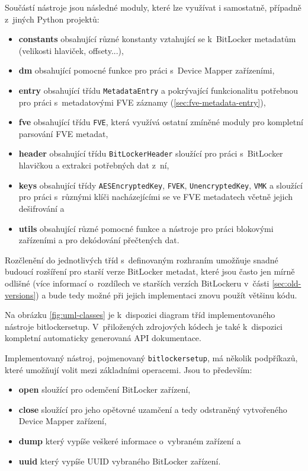 Součástí nástroje jsou následné moduly, které lze využívat i samostatně, případně z~jiných Python projektů:

\begin{itemize}
	\item \textbf{constants} obsahující různé konstanty vztahující se k~BitLocker metadatům (velikosti hlaviček, offsety...),
	\item \textbf{dm} obsahující pomocné funkce pro práci s~Device Mapper zařízeními,
	\item \textbf{entry} obsahující třídu \texttt{MetadataEntry} a pokrývající funkcionalitu potřebnou pro práci s~metadatovými FVE záznamy (\ref{sec:fve-metadata-entry}),
	\item \textbf{fve} obsahující třídu \texttt{FVE}, která využívá ostatní zmíněné moduly pro kompletní parsování FVE metadat,
	\item \textbf{header} obsahující třídu \texttt{BitLockerHeader} sloužící pro práci s~BitLocker hla\-vič\-kou a extrakci potřebných dat z~ní,
	\item \textbf{keys} obsahující třídy \texttt{AESEncryptedKey}, \texttt{FVEK}, \texttt{UnencryptedKey}, \texttt{VMK} a sloužící pro práci s~různými klíči nacházejícími se ve FVE metadatech včetně jejich dešifrování a
	\item \textbf{utils} obsahující různé pomocné funkce a nástroje pro práci blokovými zařízeními a pro dekódování přečtených dat.
\end{itemize}

Rozčlenění do jednotlivých tříd s~definovaným rozhraním umožňuje snadné budoucí rozšíření pro starší verze BitLocker metadat, které jsou často jen mírně odlišné (více informací o~rozdílech ve starších verzích BitLockeru v~části \ref{sec:old-versions}) a bude tedy možné při jejich implementaci znovu použít většinu kódu.

Na obrázku \ref{fig:uml-classes} je k~dispozici diagram tříd implementovaného nástroje bitlockersetup. V~přiložených zdrojových kódech je také k~dispozici kompletní automaticky generovaná API dokumentace.



Implementovaný nástroj, pojmenovaný \texttt{bitlockersetup}, má několik podpříkazů, které umožňují volit mezi základními operacemi. Jsou to především:

\begin{itemize}
	\item \textbf{open} sloužící pro odemčení BitLocker zařízení,
	\item \textbf{close} sloužící pro jeho opětovné uzamčení a tedy odstraněný vytvořeného Device Mapper zařízení,
	\item \textbf{dump} který vypíše veškeré informace o~vybraném zařízení a
	\item \textbf{uuid} který vypíše UUID vybraného BitLocker zařízení.
\end{itemize}

